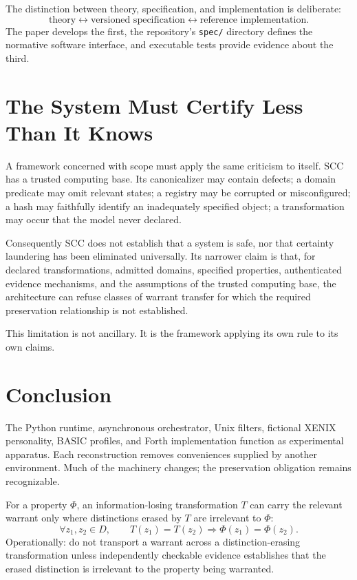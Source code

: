 \documentclass[11pt]{article}
\begin{document}
The distinction between theory, specification, and implementation is deliberate:
\[
\text{theory}\longleftrightarrow\text{versioned specification}\longleftrightarrow\text{reference implementation}.
\]
The paper develops the first, the repository's \texttt{spec/} directory defines the normative software interface, and executable tests provide evidence about the third.

\section{The System Must Certify Less Than It Knows}
A framework concerned with scope must apply the same criticism to itself. SCC has a trusted computing base. Its canonicalizer may contain defects; a domain predicate may omit relevant states; a registry may be corrupted or misconfigured; a hash may faithfully identify an inadequately specified object; a transformation may occur that the model never declared.

Consequently SCC does not establish that a system is safe, nor that certainty laundering has been eliminated universally. Its narrower claim is that, for declared transformations, admitted domains, specified properties, authenticated evidence mechanisms, and the assumptions of the trusted computing base, the architecture can refuse classes of warrant transfer for which the required preservation relationship is not established.

This limitation is not ancillary. It is the framework applying its own rule to its own claims.

\section{Conclusion}
The Python runtime, asynchronous orchestrator, Unix filters, fictional XENIX personality, BASIC profiles, and Forth implementation function as experimental apparatus. Each reconstruction removes conveniences supplied by another environment. Much of the machinery changes; the preservation obligation remains recognizable.

For a property $\Phi$, an information-losing transformation $T$ can carry the relevant warrant only where distinctions erased by $T$ are irrelevant to $\Phi$:
\[
\forall z_1,z_2\in D,\qquad T(z_1)=T(z_2)\Longrightarrow\Phi(z_1)=\Phi(z_2).
\]
Operationally: do not transport a warrant across a distinction-erasing transformation unless independently checkable evidence establishes that the erased distinction is irrelevant to the property being warranted.
\end{document}
